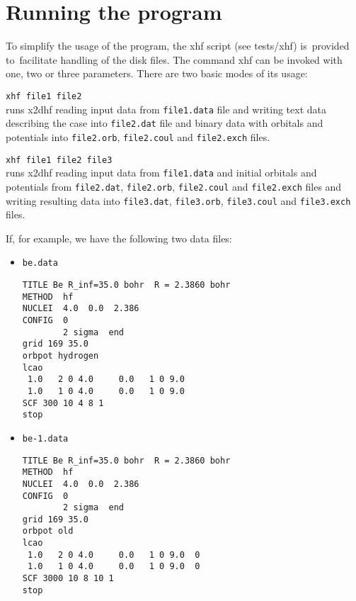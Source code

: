 \documentclass[10pt,a4paper]{article}
\begin{document}
\newpage

\section{Running the program}

\noindent
To simplify the usage of the program, the xhf script (see tests/xhf)
is~provided to~facilitate handling of the disk files.  The command xhf can
be invoked with one, two or three parameters. There are two basic modes of
its usage:

\begin{description}
\item \hspace*{0.5cm} \texttt{xhf file1 file2}\\ runs x2dhf reading
  input data from \texttt{file1.data} file and writing text data
  describing the case into \texttt{file2.dat} file and binary data
  with orbitals and potentials into \texttt{file2.orb},
  \texttt{file2.coul} and \texttt{file2.exch} files.
\end{description}


\begin{description}
\item \hspace*{0.5cm} \texttt{xhf file1 file2 file3}\\ runs x2dhf
  reading input data from \texttt{file1.data} and initial orbitals and
  potentials from \texttt{file2.dat}, \texttt{file2.orb},
  \texttt{file2.coul} and \texttt{file2.exch} files and writing
  resulting data into \texttt{file3.dat}, \texttt{file3.orb},
  \texttt{file3.coul} and \texttt{file3.exch} files.
\end{description}

If, for example, we have the following two data files:
\begin{itemize} 
\item \texttt{be.data}
{\fontsize{10}{10}\selectfont   
\begin{verbatim}
TITLE Be R_inf=35.0 bohr  R = 2.3860 bohr
METHOD  hf
NUCLEI  4.0  0.0  2.386  
CONFIG  0
        2 sigma  end
grid 169 35.0   
orbpot hydrogen
lcao
 1.0   2 0 4.0     0.0   1 0 9.0    
 1.0   1 0 4.0     0.0   1 0 9.0    
SCF 300 10 4 8 1
stop
\end{verbatim}
}

  
\item \texttt{be-1.data} 
{\fontsize{10}{10}\selectfont 
\begin{verbatim}
TITLE Be R_inf=35.0 bohr  R = 2.3860 bohr
METHOD  hf 
NUCLEI  4.0  0.0  2.386  
CONFIG  0
        2 sigma  end
grid 169 35.0   
orbpot old
lcao
 1.0   2 0 4.0     0.0   1 0 9.0  0  
 1.0   1 0 4.0     0.0   1 0 9.0  0  
SCF 3000 10 8 10 1
stop
\end{verbatim}
}
\end{itemize}   
\end{document}
